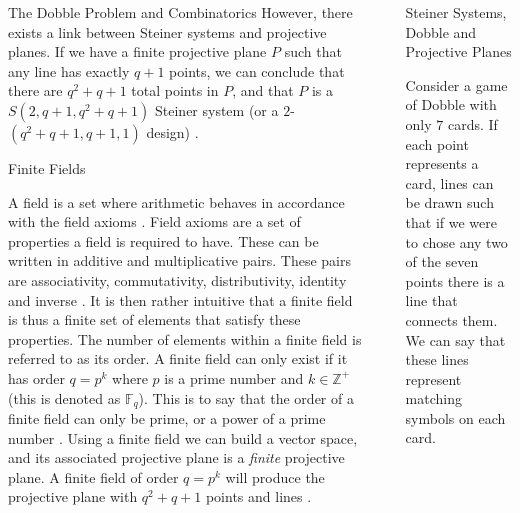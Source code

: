 \documentclass[final]{beamer}
\newlength{\sepwidth}
\newlength{\colwidth}
\newcommand{\separatorcolumn}{\begin{column}{\sepwidth}\end{column}}
\begin{document}
\begin{frame}[t]
\begin{columns}[t]
\begin{column}{\colwidth}
\begin{alertblock}{The Dobble Problem and Combinatorics}
However, there exists a link between Steiner systems and projective planes. If we have a finite projective plane $P$ such that any line has exactly $q+1$ points, we can conclude that there are $q^2+q+1$ total points in $P$, and that $P$ is a $S(2, q+ 1, q^2 +q+ 1)$
Steiner system (or a $2$-$(q^2 +q+ 1, q + 1, 1)$ design) \cite{storme2006}.
  \end{alertblock}
  
  \begin{block}{Finite Fields}

      A field is a set where arithmetic behaves in accordance with the field axioms \cite{Weisstein2023b}. Field axioms are a set of properties a field is required to have. These can be written in additive and multiplicative pairs. These pairs are associativity, commutativity, distributivity, identity and inverse \cite{Weisstein2023}. It is then rather intuitive that a finite field is thus a finite set of elements that satisfy these properties. The number of elements within a finite field is referred to as its order. A finite field can only exist if it has order $q=p^k$ where $p$ is a prime number and $k\in\mathbb{Z}^+$ \cite{cameron2000} (this is denoted as $\mathbb{F}_q$). This is to say that the order of a finite field can only be prime, or a power of a prime number \cite{cameron2000}. Using a finite field we can build a vector space, and its associated projective plane is a \emph{finite} projective plane. A finite field of order $q=p^k$ will produce the projective plane with $q^2+q+1$ points and lines \cite{Collingridge2018}.

  \end{block}

\end{column}

\separatorcolumn

\begin{column}{\colwidth}

\begin{block}{Steiner Systems, Dobble and Projective Planes}

    Consider a game of Dobble with only $7$ cards. If each point represents a card, lines can be drawn such that if we were to chose any two of the seven points there is a line that connects them. We can say that these lines represent matching symbols on each card. 


\end{block}
\end{column}
\end{columns}
\end{frame}
\end{document}
